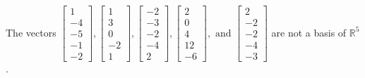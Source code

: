 \begin{exercise}
\begin{exerciseStatement}
  \end{exerciseStatement}
  \begin{exerciseAnswer}
   The vectors \(\left[\begin{array}{r}
1 \\
-4 \\
-5 \\
-1 \\
-2
\end{array}\right] , \left[\begin{array}{r}
1 \\
3 \\
0 \\
-2 \\
1
\end{array}\right] , \left[\begin{array}{r}
-2 \\
-3 \\
-2 \\
-4 \\
2
\end{array}\right] , \left[\begin{array}{r}
2 \\
0 \\
4 \\
12 \\
-6
\end{array}\right] , \text{ and } \left[\begin{array}{r}
2 \\
-2 \\
-2 \\
-4 \\
-3
\end{array}\right]\) 
  	 are not  a basis of \(\mathbb{R}^5\).
  


  \end{exerciseAnswer}
\end{exercise}